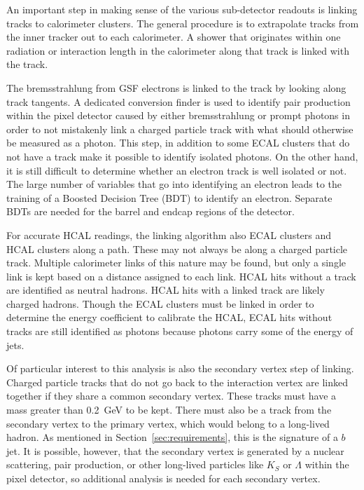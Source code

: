 An important step in making sense of the various sub-detector readouts is linking
tracks to calorimeter clusters.
The general procedure is to extrapolate tracks from the inner tracker
out to each calorimeter.
A shower that originates within one radiation or interaction length in the calorimeter
along that track is linked with the track.

The bremsstrahlung from GSF electrons is linked to the track by looking along track tangents.
A dedicated conversion finder is used to identify pair production within the pixel detector
caused by either bremsstrahlung or prompt photons in order to not mistakenly link
a charged particle track with what should otherwise be measured as a photon.
This step, in addition to some ECAL clusters that do not have a track
make it possible to identify isolated photons.
On the other hand, it is still difficult to determine
whether an electron track is well isolated or not.
The large number of variables that go into identifying an electron
leads to the training of a Boosted Decision Tree (BDT) to identify an electron.
Separate BDTs are needed for the barrel and endcap regions of the detector.

For accurate HCAL readings,
the linking algorithm also ECAL clusters and HCAL clusters along a path.
These may not always be along a charged particle track.
Multiple calorimeter links of this nature may be found,
but only a single link is kept based on a distance assigned to each link.
HCAL hits without a track are identified as neutral hadrons.
HCAL hits with a linked track are likely charged hadrons.
Though the ECAL clusters must be linked in order to determine the energy
coefficient to calibrate the HCAL,
ECAL hits without tracks are still identified as photons because photons
carry some of the energy of jets.

Of particular interest to this analysis is also the secondary vertex step of linking.
Charged particle tracks that do not go back to the interaction vertex
are linked together if they share a common secondary vertex.
These tracks must have a mass greater than \SI{0.2}{GeV} to be kept.
There must also be a track from the secondary vertex to the primary vertex,
which would belong to a long-lived hadron.
As mentioned in Section~\ref{sec:requirements}, this is the signature of a $b$ jet.
It is possible, however, that the secondary vertex is generated
by a nuclear scattering, pair production, or other long-lived particles
like $K_S$ or $\Lambda$ within the pixel detector,
so additional analysis is needed for each secondary vertex.

